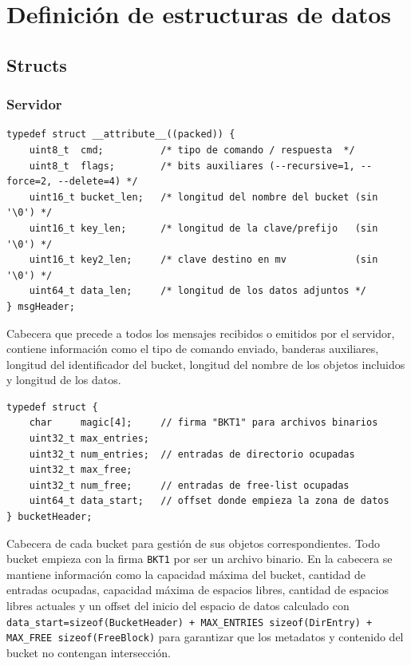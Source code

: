 \documentclass[12pt, letterpaper]{article}
\begin{document}
\section{Definición de estructuras de datos}
\subsection{Structs}
\subsubsection{Servidor}
\begin{lstlisting}
typedef struct __attribute__((packed)) {
    uint8_t  cmd;          /* tipo de comando / respuesta  */
    uint8_t  flags;        /* bits auxiliares (--recursive=1, --force=2, --delete=4) */
    uint16_t bucket_len;   /* longitud del nombre del bucket (sin '\0') */
    uint16_t key_len;      /* longitud de la clave/prefijo   (sin '\0') */
    uint16_t key2_len;     /* clave destino en mv            (sin '\0') */
    uint64_t data_len;     /* longitud de los datos adjuntos */
} msgHeader;
\end{lstlisting}
Cabecera que precede a todos los mensajes recibidos o emitidos por el servidor, contiene información como el tipo de comando enviado, banderas auxiliares, longitud del identificador del bucket, longitud del nombre de los objetos incluidos y longitud de los datos. \\

\begin{lstlisting}
typedef struct {
    char     magic[4];     // firma "BKT1" para archivos binarios
    uint32_t max_entries;
    uint32_t num_entries;  // entradas de directorio ocupadas
    uint32_t max_free;
    uint32_t num_free;     // entradas de free-list ocupadas
    uint64_t data_start;   // offset donde empieza la zona de datos
} bucketHeader;
\end{lstlisting}
Cabecera de cada bucket para gestión de sus objetos correspondientes. Todo bucket empieza con la firma \texttt{BKT1} por ser un archivo binario. En la cabecera se mantiene información como la capacidad máxima del bucket, cantidad de entradas ocupadas, capacidad máxima de espacios libres, cantidad de espacios libres actuales y un offset del inicio del espacio de datos calculado con \texttt{data\_start=sizeof(BucketHeader) + MAX\_ENTRIES \times sizeof(DirEntry) + MAX\_FREE \times sizeof(FreeBlock)} para garantizar que los metadatos y contenido del bucket no contengan intersección. \\
\end{document}
